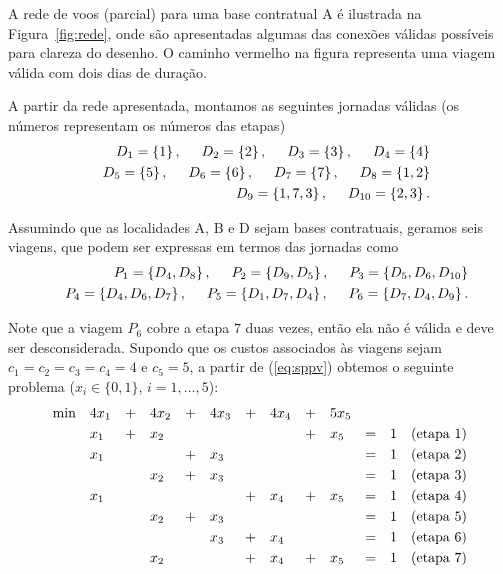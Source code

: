 A rede de voos (parcial) para uma base contratual A é ilustrada na Figura~\ref{fig:rede}, onde são
apresentadas algumas das conexões válidas possíveis para clareza do desenho. O caminho vermelho
na figura representa uma viagem válida com dois dias de duração. 

A partir da rede apresentada, montamos as seguintes jornadas válidas (os números representam os
números das etapas)
%
\begin{eqnarray*}
	&& D_1 = \{1\} \, , \hspace{0.5cm} D_2 = \{2\} \, , \hspace{0.5cm} D_3 = \{3\} \, , \hspace{0.5cm} D_4 = \{4\} \\
	&& D_5 = \{5\} \, , \hspace{0.5cm} D_6 = \{6\} \, , \hspace{0.5cm} D_7 = \{7\} \, , \hspace{0.5cm} D_8 = \{1, 2\} \\
	&& D_9 = \{1, 7 ,3\} \, , \hspace{0.5cm} D_{10} = \{2, 3\} \, . 
\end{eqnarray*}

Assumindo que as localidades A, B e D sejam bases contratuais, geramos seis viagens, que podem ser
expressas em termos das jornadas como 
%
\begin{eqnarray*}
	&& P_1 = \{D_4, D_8\} \, , \hspace{0.5cm} P_2 = \{D_9, D_5\} \, , \hspace{0.5cm} P_3 = \{D_5, D_6, D_{10}\} \\
	&& P_4 = \{D_4, D_6, D_7\} \, , \hspace{0.5cm} P_5 = \{D_1, D_7, D_4\} \, , \hspace{0.5cm} P_6 = \{D_7, D_4, D_9\}
\, . 
\end{eqnarray*}

Note que a viagem $P_6$ cobre a etapa $7$ duas vezes, então ela não é válida e deve ser 
desconsiderada. Supondo que os custos associados às viagens sejam $c_1 = c_2 = c_3 = c_4 = 4$ e
$c_5 = 5$, a partir de (\ref{eq:sppv}) obtemos o seguinte problema ($x_i \in \{0, 1\}$, 
$i=1, \ldots, 5$):
%
\begin{equation*}
	\begin{array}{lllllllllllll}
		\text{min} & 4x_1 & + & 4x_2 & + & 4x_3 & + & 4x_4 & + & 5 x_5 & & & \vsp \\ 
		& x_1 & + & x_2 & & & & & + & x_5 & = & 1 & \text{(etapa 1)} \vsp \\
		& x_1 & & & + & x_3 & & & & & = & 1 & \text{(etapa 2)} \vsp \\
		& & & x_2 & + & x_3 & & & & & = & 1 & \text{(etapa 3)} \vsp \\
		& x_1 & & & & & + & x_4 & + & x_5 & = & 1 & \text{(etapa 4)} \vsp \\
		& & & x_2 & + & x_3 & & & & & = & 1 & \text{(etapa 5)} \vsp \\
		& & & & & x_3 & + & x_4 & & & = & 1 & \text{(etapa 6)} \vsp \\
		& & & x_2 & & & + & x_4 & + & x_5 & = & 1 & \text{(etapa 7)}
	\end{array}
\end{equation*}

